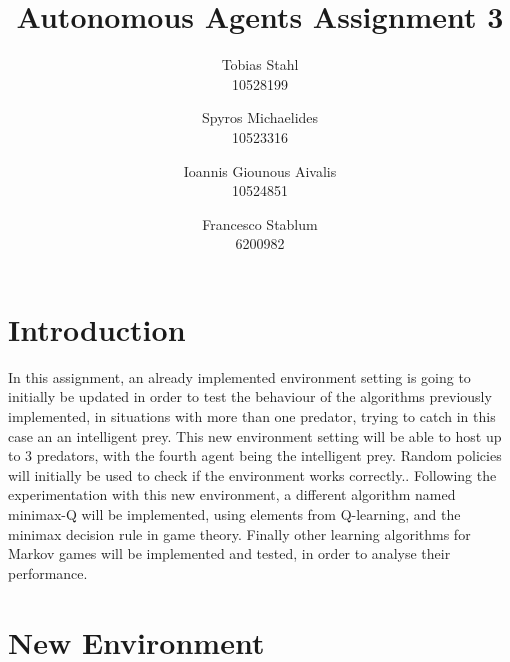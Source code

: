 \documentclass[a4paper,10pt]{article}
\title{
	\textbf{Autonomous Agents Assignment 3}
}
\author{Tobias Stahl \\ 10528199 \and Spyros Michaelides \\ 10523316 \and Ioannis Giounous Aivalis \\ 10524851 \and Francesco Stablum \\ 6200982}
\begin{document}
\maketitle


\section{Introduction}
In this assignment, an already implemented environment setting is going to initially be updated in order to test the behaviour of the algorithms previously implemented, in situations with more than one predator, trying to catch in this case an an intelligent prey. This new environment setting will be able to host up to 3 predators, with the fourth agent being the intelligent prey. Random policies will initially be used to check if the environment works correctly..
Following the experimentation with this new environment, a different algorithm named minimax-Q will be implemented, using elements from Q-learning, and the minimax decision rule in game theory.
Finally other learning algorithms for Markov games will be implemented and tested, in order to analyse their performance.












\section{New Environment}
\end{document}
